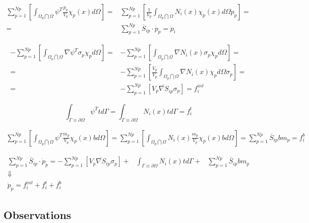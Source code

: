 \begin{eqnarray}  
  \sum^{Np}_{p=1} \left[ \int_{\Omega_p \bigcap \Omega}
  \psi^T\frac{\dot{p}_p}{V_p}\chi_p(x) d\Omega \right] =& \sum^{Np}_{p=1}\left[ \frac{1}{V_p}\int_{\Omega_p \bigcap \Omega} N_i(x) \chi_p(x) d\Omega \dot{p}_p  \right] = \nonumber \\
  =& \sum_{p=1}^{Np} \overline{S}_{ip}\cdot \dot{p}_p = \dot{p}_i
\end{eqnarray}

\begin{eqnarray}
  -\sum^{Np}_{p=1}\left[ \int_{\Omega_p \bigcap \Omega}\nabla\psi^T \sigma_p \chi_p  d\Omega \right] =& -\sum^{Np}_{p=1}\left[ \int_{\Omega_p \bigcap \Omega}\nabla N_i(x) \sigma_p \chi_p  d\Omega \right] = \nonumber \\
  =& - \sum^{Np}_{p=1}\left[ \frac{V_p}{V_p} \int_{\Omega_p \bigcap \Omega}\nabla N_i(x) \chi_p  d\Omega \sigma_p \right] = \nonumber \\
  =& - \sum^{Np}_{p=1}\left[V_p\overline{\nabla S}_{ip} \sigma_p \right] = f_i^{int}
\end{eqnarray}

\begin{equation}
  \int_{\Gamma \equiv \partial \Omega} \psi^T t d\Gamma = \int_{\Gamma \equiv \partial \Omega} N_i(x) t d\Gamma = f_i^t
\end{equation}

\begin{eqnarray}
  \sum_{p=1}^{Np} \left[ \int_{\Omega_p \bigcap \Omega} \psi^T \frac{m_p}{V_p} \chi_p(x) b d\Omega \right] = \sum_{p=1}^{Np} \left[ \int_{\Omega_p \bigcap \Omega} N_i(x)  \frac{m_p}{V_p} \chi_p(x) b d\Omega  \right] =  \sum_{p=1}^{Np} \overline{S}_{ip}b m_p = f_i^b  
\end{eqnarray}


\begin{eqnarray}
  \sum_{p=1}^{Np} \overline{S}_{ip}\cdot \dot{p}_p  =
  -\sum^{Np}_{p=1}\left[V_p\overline{\nabla S}_{ip} \sigma_p \right]
  +&  \int_{\Gamma \equiv \partial \Omega} N_i(x) t d\Gamma \nonumber
     +& \sum_{p=1}^{Np} \overline{S}_{ip}b m_p \nonumber\\
  \Downarrow&  \\
  \dot{p}_p = f_i^{int} + f_i^t + f_i^b \nonumber
\end{eqnarray}





\subsection{Observations}
\label{sec:observations}




